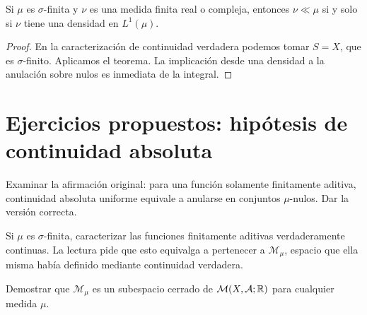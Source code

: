 \begin{corolario}\label{v2:rn-sigmafinita}
Si $\mu$ es $\sigma$-finita y $\nu$ es una medida finita real o compleja, entonces $\nu\ll\mu$ si y solo si $\nu$ tiene una densidad en $L^1(\mu)$.
\end{corolario}
\begin{proof}
En la caracterización de continuidad verdadera podemos tomar $S=X$, que es $\sigma$-finito. Aplicamos el teorema. La implicación desde una densidad a la anulación sobre nulos es inmediata de la integral.
\end{proof}

\section{Ejercicios propuestos: hipótesis de continuidad absoluta}
\begin{ejercicio}\label{ej:v2-l27-1}
Examinar la afirmación original: para una función solamente finitamente aditiva, continuidad absoluta uniforme equivale a anularse en conjuntos $\mu$-nulos. Dar la versión correcta.
\end{ejercicio}

\begin{ejercicio}\label{ej:v2-l27-2}
Si $\mu$ es $\sigma$-finita, caracterizar las funciones finitamente aditivas verdaderamente continuas. La lectura pide que esto equivalga a pertenecer a $\mathcal M_\mu$, espacio que ella misma había definido mediante continuidad verdadera.
\end{ejercicio}

\begin{ejercicio}\label{ej:v2-l27-3}
Demostrar que $\mathcal M_\mu$ es un subespacio cerrado de $\mathcal M(X,\mathcal A;\mathbb R)$ para cualquier medida $\mu$.
\end{ejercicio}


